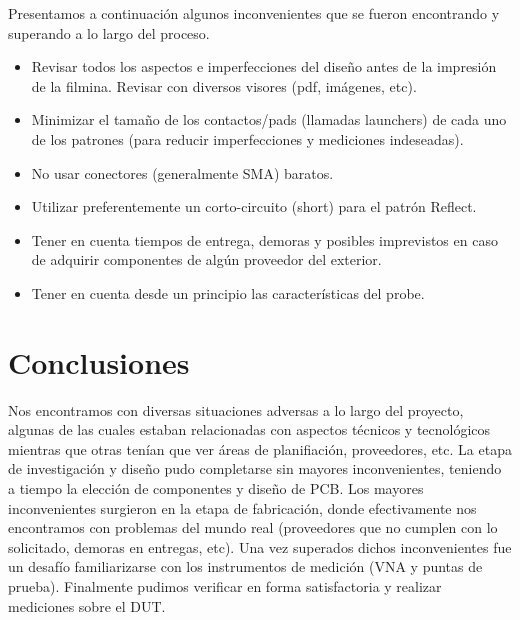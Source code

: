 \documentclass[10pt, a4paper, twocolumn]{article}
\begin{document}
Presentamos a continuación algunos inconvenientes que se fueron encontrando y
superando a lo largo del proceso.
\begin{itemize}
\item Revisar todos los aspectos e imperfecciones del diseño antes de la impresión de la filmina. Revisar con diversos visores (pdf, imágenes, etc).
\item Minimizar el tamaño de los contactos/pads (llamadas launchers) de cada uno de los patrones (para reducir imperfecciones y mediciones indeseadas).
\item No usar conectores (generalmente SMA) baratos.
\item Utilizar preferentemente un corto-circuito (short) para el patrón Reflect.
\item Tener en cuenta tiempos de entrega, demoras y posibles imprevistos en caso de adquirir
componentes de algún proveedor del exterior.
\item Tener en cuenta desde un principio las características del probe.
\end{itemize}

\section{Conclusiones}

Nos encontramos con diversas situaciones adversas a lo largo del proyecto, algunas de las cuales estaban
relacionadas con aspectos técnicos y tecnológicos mientras que otras tenían que ver áreas de planifiación, proveedores, etc. La etapa de investigación y diseño pudo completarse sin mayores inconvenientes, teniendo
a tiempo la elección de componentes y diseño de PCB. Los mayores inconvenientes surgieron en la etapa de
fabricación, donde efectivamente nos encontramos con problemas del mundo real (proveedores que no cumplen
con lo solicitado, demoras en entregas, etc). Una vez superados dichos inconvenientes fue un desafío familiarizarse con los instrumentos de medición (VNA y puntas de prueba). Finalmente pudimos verificar en
forma satisfactoria y realizar mediciones sobre el DUT.


\medskip
\end{document}
